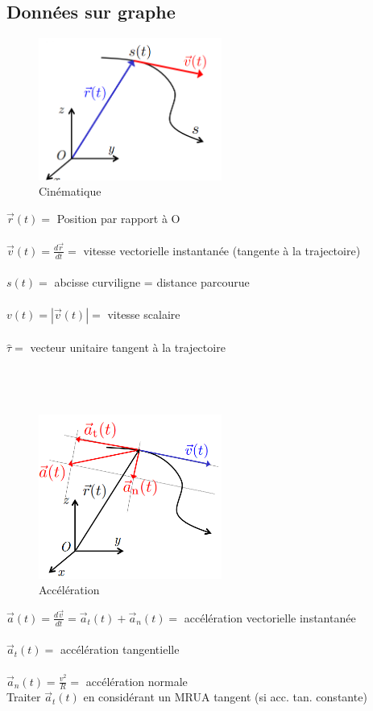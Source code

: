 \documentclass{article}
\begin{document}
\subsection{Données sur graphe}
\begin{figure}
    \centering
    \includegraphics[width=6cm]{Images/Mouvement.png}
    \caption{Cinématique}
    \label{fig:cinématique}
\end{figure}
\( \overrightarrow{r}(t) = \) Position par rapport à O \\\\
\( \overrightarrow{v}(t) = \frac{d \overrightarrow{r}}{dt} = \) vitesse vectorielle instantanée (tangente à la trajectoire)\\\\
\( s(t) =\) abcisse curviligne = distance parcourue \\\\
\( v(t) = |\overrightarrow{v}(t)| = \) vitesse scalaire \\\\
\( \hat{\tau} = \) vecteur unitaire tangent à la trajectoire\\\\\\\\
\begin{figure}[htp]
    \centering
    \includegraphics[width=6cm]{Images/acceleration.png}
    \caption{Accélération}
    \label{fig:acceleration}
\end{figure}
\( \overrightarrow{a}(t) = \frac{d\overrightarrow{v}}{dt} = \overrightarrow{a}_t(t) + \overrightarrow{a}_n(t) = \) accélération vectorielle instantanée \\\\
\( \overrightarrow{a}_t(t) = \) accélération tangentielle \\\\
\( \overrightarrow{a}_n(t) = \frac{v^2}{R} = \) accélération normale \\
Traiter \( \overrightarrow{a}_t(t) \) en considérant un MRUA tangent (si acc. tan. constante)
\end{document}
